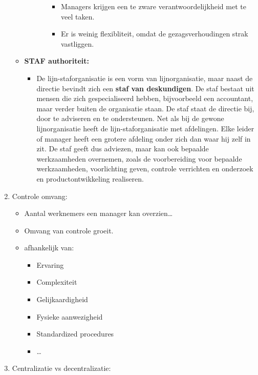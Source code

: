 \documentclass[12pt]{article}
\begin{document}
\begin{enumerate}
\begin{itemize}
\begin{itemize}
\begin{itemize}
\begin{itemize}
                    \item Managers krijgen een te zware verantwoordelijkheid met te veel taken.
                    \item Er is weinig flexibliteit, omdat de gezagsverhoudingen strak vastliggen.
                \end{itemize}
            \end{itemize}
        \end{itemize}
        \item[]\textbf{STAF authoriteit:}\begin{itemize}
            \item De lijn-staforganisatie is een vorm van lijnorganisatie, maar naast de directie bevindt zich een \textbf{staf van deskundigen}. De staf bestaat uit mensen die zich gespecialiseerd hebben, bijvoorbeeld een accountant, maar verder buiten de organisatie staan. De staf staat de directie bij, door te adviseren en te ondersteunen. Net als bij de gewone lijnorganisatie heeft de lijn-staforganisatie met afdelingen. Elke leider of manager heeft een grotere afdeling onder zich dan waar hij zelf in zit. De staf geeft dus adviezen, maar kan ook bepaalde werkzaamheden overnemen, zoals de voorbereiding voor bepaalde werkzaamheden, voorlichting geven, controle verrichten en onderzoek en productontwikkeling realiseren.
        \end{itemize}
    \end{itemize}
    \item Controle omvang:\begin{itemize}
        \item Aantal werknemers een manager kan overzien\dots
        \item Omvang van controle groeit.
        \item[] afhankelijk van:\begin{itemize}
            \item Ervaring
            \item Complexiteit
            \item Gelijkaardigheid
            \item Fysieke aanwezigheid
            \item Standardized procedures
            \item \dots
        \end{itemize}
    \end{itemize}
    \item Centralizatie vs decentralizatie:\begin{itemize}

\end{itemize}
\end{enumerate}
\end{document}
